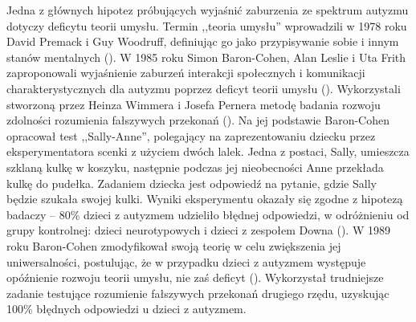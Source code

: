     Jedna z głównych hipotez próbujących wyjaśnić zaburzenia ze spektrum autyzmu dotyczy deficytu teorii umysłu. Termin ,,teoria umysłu'' wprowadzili w 1978 roku David Premack i Guy Woodruff, definiując go jako przypisywanie sobie i innym stanów mentalnych (\cite{premack1978does}).
    W 1985 roku Simon Baron-Cohen, Alan Leslie i Uta Frith zaproponowali wyjaśnienie zaburzeń interakcji społecznych i komunikacji charakterystycznych dla autyzmu poprzez deficyt teorii umysłu (\cite{baron1985does}).
    Wykorzystali stworzoną przez Heinza Wimmera i Josefa Pernera metodę badania rozwoju zdolności rozumienia fałszywych przekonań (\cite{wimmer1983beliefs}).
    Na jej podstawie Baron-Cohen opracował test ,,Sally-Anne'', polegający na zaprezentowaniu dziecku przez eksperymentatora scenki z użyciem dwóch lalek.
    Jedna z postaci, Sally, umieszcza szklaną kulkę w koszyku, następnie podczas jej nieobecności Anne przekłada kulkę do pudełka.
    Zadaniem dziecka jest odpowiedź na pytanie, gdzie Sally będzie szukała swojej kulki.
    Wyniki eksperymentu okazały się zgodne z hipotezą badaczy -- 80\% dzieci z autyzmem udzieliło błędnej odpowiedzi, w odróżnieniu od grupy kontrolnej: dzieci neurotypowych i dzieci z zespołem Downa (\cite{baron1985does}).
    W 1989 roku Baron-Cohen zmodyfikował swoją teorię w celu zwiększenia jej uniwersalności, postulując, że w przypadku dzieci z autyzmem występuje opóźnienie rozwoju teorii umysłu, nie zaś deficyt (\cite{baron1989autistic}).
    Wykorzystał trudniejsze zadanie testujące rozumienie fałszywych przekonań drugiego rzędu, uzyskując 100\% błędnych odpowiedzi u dzieci z autyzmem.
    
